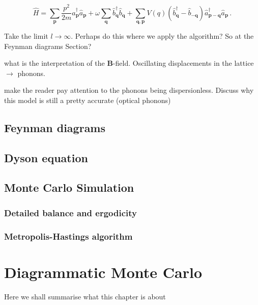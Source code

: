 \documentclass[12pt]{report}
\renewcommand{\vec}[1]{\boldsymbol{\mathbf{#1}}}                        %
\newcommand{\todo}[1]{\textcolor{todo}{#1}}
\begin{document}
\begin{equation}
	\hat H
	= \sum_{\vec p} \frac{p^2}{2m} \hat a^\dagger_{\vec p} \hat a_{\vec p}
	+ \omega \sum_{\vec q} \hat b^\dagger_{\vec q} \hat b_{\vec q}
	+  \sum_{\vec q, \vec p} V (q) \left( \hat b^\dagger_{\vec q} - \hat b_{- \vec q} \right) \hat a^\dagger_{\vec p - \vec q} \hat a_{\vec p} \,.
\end{equation}

\todo{Take the limit $ l \rightarrow \infty $. Perhaps do this where we apply the algorithm? So at the Feynman diagrams Section?}

\todo{what is the interpretation of the $ \vec B $-field. Oscillating displacements in the lattice $ \rightarrow $ phonons.}

\todo{make the reader pay attention to the phonons being dispersionless. Discuss why this model is still a pretty accurate (optical phonons)}



\section{Feynman diagrams}




\section{Dyson equation}



\section{Monte Carlo Simulation}

\subsection{Detailed balance and ergodicity}

\subsection{Metropolis-Hastings algorithm}



\chapter{Diagrammatic Monte Carlo}

\todo{Here we shall summarise what this chapter is about}
\end{document}
